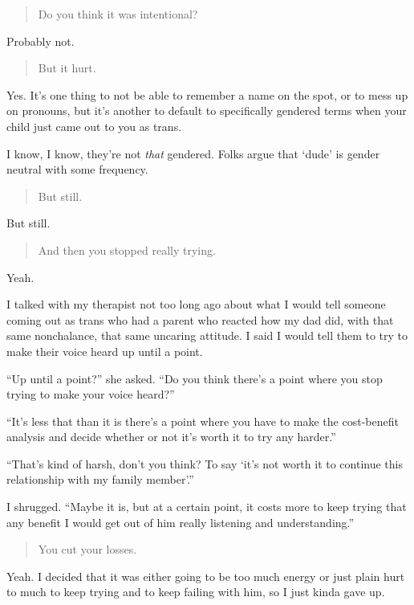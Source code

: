 \begin{quote}
Do you think it was intentional?
\end{quote}

Probably not.

\begin{quote}
But it hurt.
\end{quote}

Yes. It's one thing to not be able to remember a name on the spot, or to mess up on pronouns, but it's another to default to specifically gendered terms when your child just came out to you as trans.

I know, I know, they're not \emph{that} gendered. Folks argue that `dude' is gender neutral with some frequency.

\begin{quote}
But still.
\end{quote}

But still.

\begin{quote}
And then you stopped really trying.
\end{quote}

Yeah.

I talked with my therapist not too long ago about what I would tell someone coming out as trans who had a parent who reacted how my dad did, with that same nonchalance, that same uncaring attitude. I said I would tell them to try to make their voice heard up until a point.

``Up until a point?'' she asked. ``Do you think there's a point where you stop trying to make your voice heard?''

``It's less that than it is there's a point where you have to make the cost-benefit analysis and decide whether or not it's worth it to try any harder.''

``That's kind of harsh, don't you think? To say `it's not worth it to continue this relationship with my family member'.''

I shrugged. ``Maybe it is, but at a certain point, it costs more to keep trying that any benefit I would get out of him really listening and understanding.''

\begin{quote}
You cut your losses.
\end{quote}

Yeah. I decided that it was either going to be too much energy or just plain hurt to much to keep trying and to keep failing with him, so I just kinda gave up.

